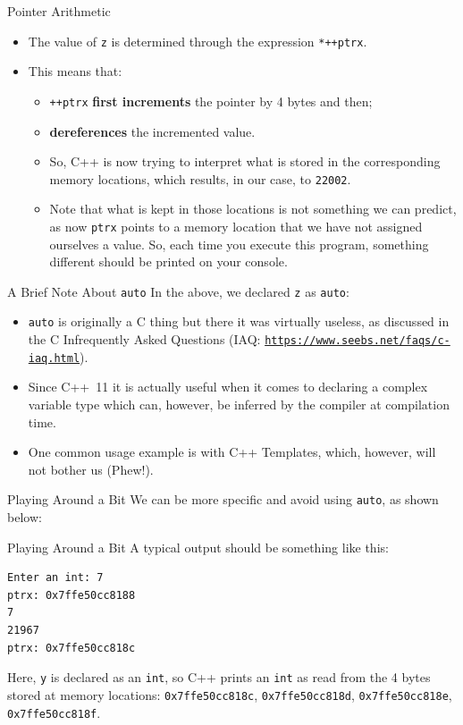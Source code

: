 \documentclass[aspectratio=169, 12pt]{beamer}
\newcommand{\ohref}[1]{\href{#1}{\texttt{#1}}}
\begin{document}
	\begin{frame}{Pointer Arithmetic}
		\begin{itemize}
			\item The value of \texttt{z} is determined through the expression \texttt{*++ptrx}.
			\item This means that:
			\begin{itemize}
				\item \texttt{++ptrx} \textbf{first increments} the pointer by 4 bytes and then;
				\item \textbf{dereferences} the incremented value.
				\item So, C++ is now trying to interpret what is stored in the corresponding memory locations, which results, in our case, to \texttt{22002}.
				\item Note that what is kept in those locations is not something we can predict, as now \texttt{ptrx} points to a memory location that we have not assigned ourselves a value. So, each time you execute this program, something different should be printed on your console.
			\end{itemize}
		\end{itemize}
	\end{frame}

	\begin{headsup}{A Brief Note About \texttt{auto}}
		In the above, we declared \texttt{z} as \texttt{auto}:
		\begin{itemize}
			\item \texttt{auto} is originally a C thing but there it was virtually useless, as discussed in the C Infrequently Asked Questions (IAQ: \ohref{https://www.seebs.net/faqs/c-iaq.html}).
			\item Since C++~11 it is actually useful when it comes to declaring a complex variable type which can, however, be inferred by the compiler at compilation time.
			\item One common usage example is with C++ Templates, which, however, will not bother us (Phew!).
		\end{itemize}
	\end{headsup}

	\begin{frame}{Playing Around a Bit}
		We can be more specific and avoid using \texttt{auto}, as shown below:
		\scalebox{0.85}{%
		}
	\end{frame}

	\begin{frame}[fragile]{Playing Around a Bit}
		A typical output should be something like this:
		\begin{verbatim}
Enter an int: 7
ptrx: 0x7ffe50cc8188
7
21967
ptrx: 0x7ffe50cc818c
\end{verbatim}
	Here, \texttt{y} is declared as an \texttt{int}, so C++ prints an \texttt{int} as read from the 4 bytes stored at memory locations: \texttt{0x7ffe50cc818c}, \texttt{0x7ffe50cc818d}, \texttt{0x7ffe50cc818e}, \texttt{0x7ffe50cc818f}.
	\end{frame}
\end{document}
